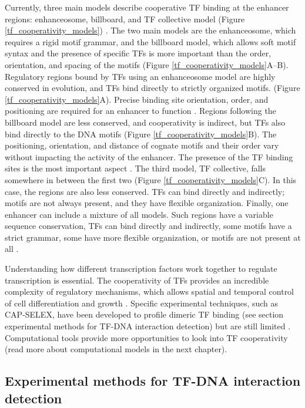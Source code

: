     Currently, three main models describe cooperative TF binding at the enhancer regions: enhanceosome, billboard, and TF collective model ({Figure \ref{tf_cooperativity_models}}) \cite{spitz2012transcription,long2016ever,georgakopoulos2023transcription}. The two main models are the enhanceosome, which requires a rigid motif grammar, and the billboard model, which allows soft motif syntax and the presence of specific TFs is more important than the order, orientation, and spacing of the motifs ({Figure \ref{tf_cooperativity_models}}A--B). Regulatory regions bound by TFs using an enhanceosome model are highly conserved in evolution, and TFs bind directly to strictly organized motifs. ({Figure \ref{tf_cooperativity_models}}A). Precise binding site orientation, order, and positioning are required for an enhancer to function \cite{georgakopoulos2023transcription}. Regions following the billboard model are less conserved, and cooperativity is indirect, but TFs also bind directly to the DNA motifs ({Figure \ref{tf_cooperativity_models}}B). The positioning, orientation, and distance of cognate motifs and their order vary without impacting the activity of the enhancer. The presence of the TF binding sites is the most important aspect \cite{georgakopoulos2023transcription}. The third model, TF collective, falls somewhere in between the first two ({Figure \ref{tf_cooperativity_models}}C). In this case, the regions are also less conserved. TFs can bind directly and indirectly; motifs are not always present, and they have flexible organization. Finally, one enhancer can include a mixture of all models. Such regions have a variable sequence conservation, TFs can bind directly and indirectly, some motifs have a strict grammar, some have more flexible organization, or motifs are not present at all \cite{long2016ever}.

    Understanding how different transcription factors work together to regulate transcription is essential. The cooperativity of TFs provides an incredible complexity of regulatory mechanisms, which allows spatial and temporal control of cell differentiation and growth \cite{spitz2012transcription}. Specific experimental techniques, such as CAP-SELEX, have been developed to profile dimeric TF binding (see section experimental methods for TF-DNA interaction detection) but are still limited \cite{jolma2015dna}. Computational tools provide more opportunities to look into TF cooperativity (read more about computational models in the next chapter).

    \subsection{Experimental methods for TF-DNA interaction detection}

